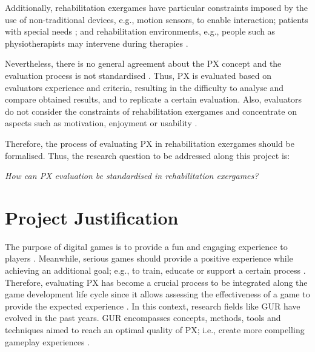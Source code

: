 Additionally, rehabilitation exergames have particular constraints imposed by the use of non-traditional devices, e.g., motion sensors, to enable interaction; patients with special needs \autocite{Pirovano2016,Wiemeyer2015,Sinclair2007,Ni2014,Cameirao2010,Nijholt2008}; and rehabilitation environments, e.g., people such as physiotherapists may intervene during therapies \autocite{Wiemeyer2015,Nijholt2008}. 

Nevertheless, there is no general agreement about the \ac{PX} concept and the evaluation process is not standardised \autocite{Yanez-Gomez2017,Wiemeyer2016,Mueller2015}. Thus, \ac{PX} is evaluated based on evaluators experience and criteria, resulting in the difficulty to analyse and compare obtained results, and to replicate a certain evaluation. Also, evaluators do not consider the constraints of rehabilitation exergames and concentrate on aspects such as motivation, enjoyment or usability \autocite{Brokaw2015,Ni2014,Cameirao2010,jansen2013serious}.

Therefore, the process of evaluating \ac{PX} in rehabilitation exergames should be formalised. Thus, the research question to be addressed along this project is:

\begin{center} 
\emph{How can \ac{PX} evaluation be standardised in rehabilitation exergames?}
\end{center} 


\section{Project Justification}\label{sec:problemJustfication}

The purpose of digital games is to provide a fun and engaging experience to players \autocite{Moosajee,Zammitto2014}. Meanwhile, serious games should provide a positive experience while achieving an additional goal; e.g., to train, educate or support a certain process \autocite{Wiemeyer2016}. Therefore, evaluating \ac{PX} has become a crucial process to be integrated along the game development life cycle since it allows assessing the effectiveness of a game to provide the expected experience \autocite{Bernhaupt2015,McAllister2015,desurvire_methods_2013,Nacke2009}. In this context, research fields like \ac{GUR} have evolved in the past years. \ac{GUR} encompasses concepts, methods, tools and techniques aimed to reach an optimal quality of \ac{PX}; i.e., create more compelling gameplay experiences \autocite{Moosajee,Nacke2015,Wiemeyer2016,Drachen2013}.

